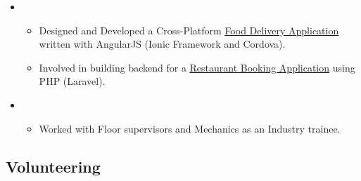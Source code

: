\documentclass[11pt,a4paper,sans]{moderncv}
\begin{document}
\begin{itemize}

\vspace{6pt}

\item{}

\begin{itemize}
    \item Designed and Developed a Cross-Platform \underline{\href{https://staple.today/}{Food Delivery Application}} written with AngularJS (Ionic Framework and Cordova). 

    \item Involved in building backend for a \underline{\href{https://play.google.com/store/apps/details?id=com.sense.today.ballyhoo}{Restaurant Booking Application}} using PHP (Laravel).

\end{itemize}

\vspace{6pt}

\item{}

\begin{itemize}

    \item Worked with Floor supervisors and Mechanics as an Industry trainee.

\end{itemize}

\end{itemize}

\vspace{6pt}

\subsection{Volunteering}
\end{document}
